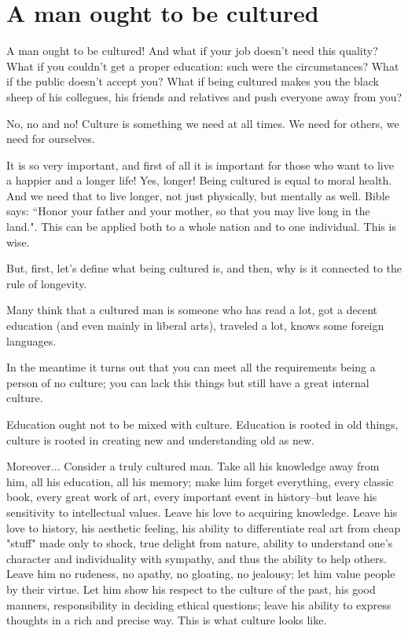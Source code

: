\chapter{A man ought to be cultured}

A man ought to be cultured! And what if your job doesn't need this quality? What if you couldn't get a proper education: such were the circumstances? What if the public doesn't accept you? What if being cultured makes you the black sheep of his collegues, his friends and relatives and push everyone away from you?

No, no and no! Culture is something we need at all times. We need for others, we need for ourselves.

It is so very important, and first of all it is important for those who want to live a happier and a longer life! Yes, longer! Being cultured is equal to moral health. And we need that to live longer, not just physically, but mentally as well. Bible says: “Honor your father and your mother, so that you may live long in the land.". This can be applied both to a whole nation and to one individual. This is wise.

But, first, let's define what being cultured is, and then, why is it connected to the rule of longevity.

Many think that a cultured man is someone who has read a lot, got a decent education (and even mainly in liberal arts), traveled a lot, knows some foreign languages.

In the meantime it turns out that you can meet all the requirements being a person of no culture; you can lack this things but still have a great internal culture.

Education ought not to be mixed with culture. Education is rooted in old things, culture is rooted in creating new and understanding old as new.

Moreover... Consider a truly cultured man. Take all his knowledge away from him, all his education, all his memory; make him forget everything, every classic book, every great work of art, every important event in history--but leave his sensitivity to intellectual values. Leave his love to acquiring knowledge. Leave his love to history, his aesthetic feeling, his ability to differentiate real art from cheap "stuff" made only to shock, true delight from nature, ability to understand one's character and individuality with sympathy, and thus the ability to help others. Leave him no rudeness, no apathy, no gloating, no jealousy; let him value people by their virtue. Let him show his respect to the culture of the past, his good manners, responsibility in deciding ethical questions; leave his ability to express thoughts in a rich and precise way. This is what culture looks like.

